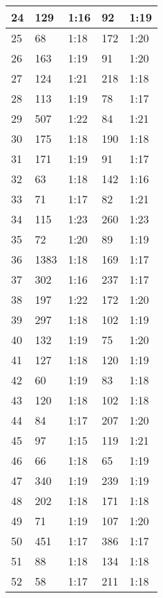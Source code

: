 \begin{center}
\begin{longtable}{|p{2cm}|l|l|l|l|}
24      & 129 	  & 1:16	&	92     & 1:19 \\ \hline
25      & 68  	  & 1:18	&	172    & 1:20 \\ \hline
26      & 163 	  & 1:19	&	91     & 1:20 \\ \hline
27      & 124 	  & 1:21	&	218    & 1:18 \\ \hline
28      & 113 	  & 1:19	&	78     & 1:17 \\ \hline
29      & 507 	  & 1:22	&	84     & 1:21 \\ \hline
30      & 175 	  & 1:18	&	190    & 1:18 \\ \hline
31      & 171 	  & 1:19	&	91     & 1:17 \\ \hline
32      & 63  	  & 1:18	&	142    & 1:16 \\ \hline
33      & 71  	  & 1:17	&	82     & 1:21 \\ \hline
34      & 115 	  & 1:23	&	260    & 1:23 \\ \hline
35      & 72  	  & 1:20	&	89     & 1:19 \\ \hline
36      & 1383 	  & 1:18	&	169    & 1:17 \\ \hline
37      & 302 	  & 1:16	&	237    & 1:17 \\ \hline
38      & 197 	  & 1:22	&	172    & 1:20 \\ \hline
39      & 297 	  & 1:18	&	102    & 1:19 \\ \hline
40      & 132 	  & 1:19	&	75     & 1:20 \\ \hline
41      & 127 	  & 1:18	&	120    & 1:19 \\ \hline
42      & 60   	  & 1:19	&	83     & 1:18 \\ \hline
43      & 120 	  & 1:18	&	102    & 1:18 \\ \hline
44      & 84  	  & 1:17	&	207    & 1:20 \\ \hline
45      & 97  	  & 1:15	&	119    & 1:21 \\ \hline
46      & 66  	  & 1:18	&	65     & 1:19 \\ \hline
47      & 340 	  & 1:19	&	239    & 1:19 \\ \hline
48      & 202 	  & 1:18	&	171    & 1:18 \\ \hline
49      & 71  	  & 1:19	&	107    & 1:20 \\ \hline
50      & 451 	  & 1:17	&	386    & 1:17 \\ \hline
51      & 88  	  & 1:18	&	134    & 1:18 \\ \hline
52      & 58  	  & 1:17	&	211    & 1:18 \\ \hline

\end{longtable}
\end{center}
